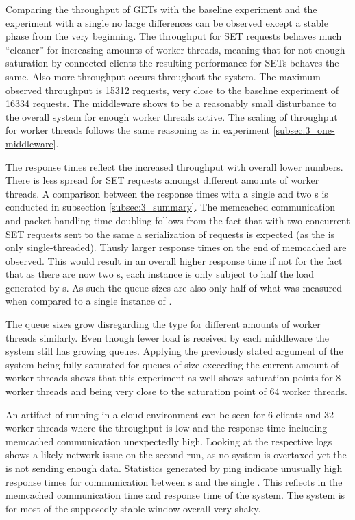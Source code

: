             Comparing the throughput of GETs with the baseline experiment and the experiment with a single \mw{} no
            large differences can be observed except a stable phase from the very beginning. The throughput for SET
            requests behaves much ``cleaner'' for increasing amounts of worker-threads, meaning that for not enough
            saturation by connected clients the resulting performance for SETs behaves the same. Also more throughput
            occurs throughout the system. The maximum observed throughput is 15312 requests, very close to the baseline
            experiment of 16334 requests. The middleware shows to be a reasonably small disturbance to the overall
            system for enough worker threads active. The scaling of throughput for worker threads follows the same
            reasoning as in experiment \ref{subsec:3_one-middleware}.

            The response times reflect the increased throughput with overall lower numbers. There is less spread for SET
            requests amongst different amounts of worker threads. A comparison between the response times with a single
            \mw{} and two \mw{}s is conducted in subsection \ref{subsec:3_summary}. The memcached communication and
            packet handling time doubling follows from the fact that with two concurrent \mw{} SET requests sent to the
            same \srv{} a serialization of requests is expected (as the \srv{} is only single-threaded). Thusly larger
            response times on the end of memcached are observed. This would result in an overall higher response time if
            not for the fact that as there are now two \mw{}s, each instance is only subject to half the load generated
            by \cli{}s. As such the queue sizes are also only half of what was measured when compared to a single
            instance of \mw{}.

            The queue sizes grow disregarding the type for different amounts of worker threads similarly. Even though
            fewer load is received by each middleware the system still has growing queues. Applying the previously
            stated argument of the system being fully saturated for queues of size exceeding the current amount of
            worker threads shows that this experiment as well shows saturation points for 8 worker threads
            and being very close to the saturation point of 64 worker threads.

            An artifact of running in a cloud environment can be seen for 6 clients and 32 worker threads where the
            throughput is low and the response time including memcached communication unexpectedly high. Looking at the
            respective logs shows a likely network issue on the second run, as no system is overtaxed yet the
            \srv{} is not sending enough data. Statistics generated by ping indicate unusually high response times for
            communication between \mw{}s and the single \srv{}. This reflects in the memcached communication time and
            response time of the system. The system is for most of the supposedly stable window overall very shaky.

